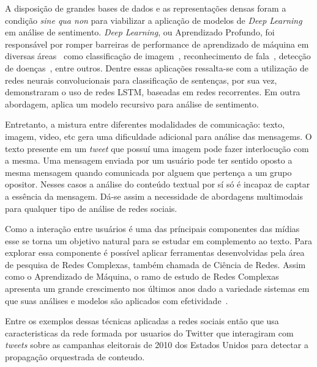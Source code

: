 A disposição de grandes bases de dados e as representações densas foram a
condição \textit{sine qua non} para viabilizar a aplicação de modelos de
\textit{Deep Learning} em análise de sentimento.
\textit{Deep Learning}, ou Aprendizado Profundo, foi responsável por romper
barreiras de performance de aprendizado de máquina em diversas
áreas~\cite{lecun15} como classificação de imagem~\cite{krizhevsky12},
reconhecimento de fala~\cite{hinton12a}, detecção de doenças~\cite{esteva17},
entre outros.
Dentre essas aplicações ressalta-se \citet{kim14} com a utilização de redes
neurais convolucionais para classificação de sentenças, por sua vez,
\citet{zhou16} demonstraram o uso de redes LSTM, baseadas em redes recorrentes.
Em outra abordagem, \citet{socher13} aplica um modelo recursivo para análise de
sentimento.

Entretanto, a mistura entre diferentes modalidades de comunicação: texto, imagem,
video, etc gera uma dificuldade adicional para análise das mensagems.
O texto presente em um \textit{tweet} que possuí uma imagem pode fazer
interlocução com a mesma.
Uma mensagem enviada por um usuário pode ter sentido oposto a mesma mensagem
quando comunicada por alguem que pertença a um grupo opositor.
Nesses casos a análise do conteúdo textual por sí só é incapaz de captar a
essência da mensagem.
Dá-se assim a necessidade de abordagens multimodais para qualquer tipo de
análise de redes sociais.

Como a interação entre usuários é uma das príncipais componentes das mídias esse
se torna um objetivo natural para se estudar em complemento ao texto.
Para explorar essa componente é possível aplicar ferramentas desenvolvidas pela
área de pesquisa de Redes Complexas, também chamada de Ciência de Redes.
Assim como o Aprendizado de Máquina, o ramo de estudo de Redes Complexas
apresenta um grande crescimento nos últimos anos dado a variedade sistemas em
que suas análises e modelos são aplicados com efetividade~\cite{albert02}.

Entre os exemplos dessas técnicas aplicadas a redes sociais então
\citet{ratkiewicz11} que usa caracteristicas da rede formada por usuarios do
Twitter que interagiram com \textit{tweets} sobre as campanhas eleitorais de
2010 dos Estados Unidos para detectar a propagação orquestrada de conteudo.




